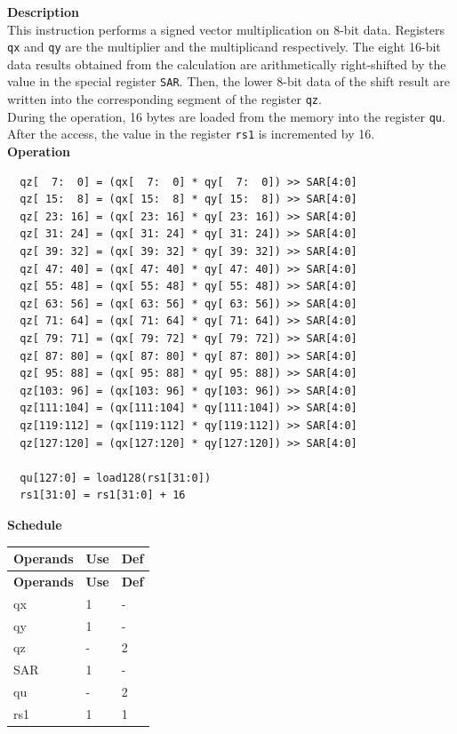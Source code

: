 \textbf{Description}\\
This instruction performs a signed vector multiplication on 8-bit data. Registers \lstinline{qx} and \lstinline{qy} are the multiplier and the multiplicand respectively. The eight 16-bit data results obtained from the calculation are arithmetically right-shifted by the value in the special register \lstinline{SAR}. Then, the lower 8-bit data of the shift result are written into the corresponding segment of the register \lstinline{qz}.\\
During the operation, 16 bytes are loaded from the memory into the register \lstinline{qu}. After the access, the value in the register \lstinline{rs1} is incremented by 16.\\
\textbf{Operation}
\begin{lstlisting}
  qz[  7:  0] = (qx[  7:  0] * qy[  7:  0]) >> SAR[4:0]
  qz[ 15:  8] = (qx[ 15:  8] * qy[ 15:  8]) >> SAR[4:0]
  qz[ 23: 16] = (qx[ 23: 16] * qy[ 23: 16]) >> SAR[4:0]
  qz[ 31: 24] = (qx[ 31: 24] * qy[ 31: 24]) >> SAR[4:0]
  qz[ 39: 32] = (qx[ 39: 32] * qy[ 39: 32]) >> SAR[4:0]
  qz[ 47: 40] = (qx[ 47: 40] * qy[ 47: 40]) >> SAR[4:0]
  qz[ 55: 48] = (qx[ 55: 48] * qy[ 55: 48]) >> SAR[4:0]
  qz[ 63: 56] = (qx[ 63: 56] * qy[ 63: 56]) >> SAR[4:0]
  qz[ 71: 64] = (qx[ 71: 64] * qy[ 71: 64]) >> SAR[4:0]
  qz[ 79: 71] = (qx[ 79: 72] * qy[ 79: 72]) >> SAR[4:0]
  qz[ 87: 80] = (qx[ 87: 80] * qy[ 87: 80]) >> SAR[4:0]
  qz[ 95: 88] = (qx[ 95: 88] * qy[ 95: 88]) >> SAR[4:0]
  qz[103: 96] = (qx[103: 96] * qy[103: 96]) >> SAR[4:0]
  qz[111:104] = (qx[111:104] * qy[111:104]) >> SAR[4:0]
  qz[119:112] = (qx[119:112] * qy[119:112]) >> SAR[4:0]
  qz[127:120] = (qx[127:120] * qy[127:120]) >> SAR[4:0]

  qu[127:0] = load128(rs1[31:0])
  rs1[31:0] = rs1[31:0] + 16
\end{lstlisting}


\textbf{Schedule}\\
\begin{longtable}[c]{|l|l|l|}
    \hline
    \rowcolor{lightgray}
    \textbf{Operands} & \textbf{Use} & \textbf{Def} \\\hline
    \endfirsthead
    \hline
    \rowcolor{lightgray}
     \textbf{Operands} & \textbf{Use} & \textbf{Def} \\\hline
    \endhead
    \hline
    \endfoot

    qx & 1 & - \\\hline
  qy & 1 & - \\\hline
     qz & - & 2 \\\hline
    SAR & 1 & - \\\hline
    qu & - & 2 \\\hline
    rs1 & 1 & 1

\end{longtable}

